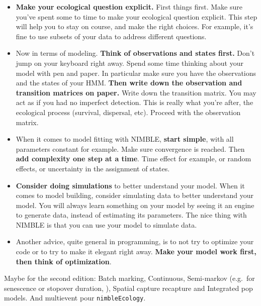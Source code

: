 \documentclass[
  12pt,
]{krantz}
\begin{document}
\begin{itemize}
\item
  \textbf{Make your ecological question explicit.} First things first. Make sure you've spent some to time to make your ecological question explicit. This step will help you to stay on course, and make the right choices. For example, it's fine to use subsets of your data to address different questions.
\item
  Now in terms of modeling. \textbf{Think of observations and states first.} Don't jump on your keyboard right away. Spend some time thinking about your model with pen and paper. In particular make sure you have the observations and the states of your HMM. \textbf{Then write down the observation and transition matrices on paper.} Write down the transition matrix. You may act as if you had no imperfect detection. This is really what you're after, the ecological process (survival, dispersal, etc). Proceed with the observation matrix.
\item
  When it comes to model fitting with NIMBLE, \textbf{start simple}, with all parameters constant for example. Make sure convergence is reached. Then \textbf{add complexity one step at a time}. Time effect for example, or random effects, or uncertainty in the assignment of states.
\item
  \textbf{Consider doing simulations} to better understand your model. When it comes to model building, consider simulating data to better understand your model. You will always learn something on your model by seeing it an engine to generate data, instead of estimating its parameters. The nice thing with NIMBLE is that you can use your model to simulate data.
\item
  Another advice, quite general in programming, is to not try to optimize your code or to try to make it elegant right away. \textbf{Make your model work first, then think of optimization}.
\end{itemize}

Maybe for the second edition: Batch marking, Continuous, Semi-markov (e.g.~for senescence or stopover duration, \citet{choquet_semi-markov_2011}), Spatial capture recapture and Integrated pop models. And multievent pour \texttt{nimbleEcology}.

\backmatter

  

\printindex
\end{document}
